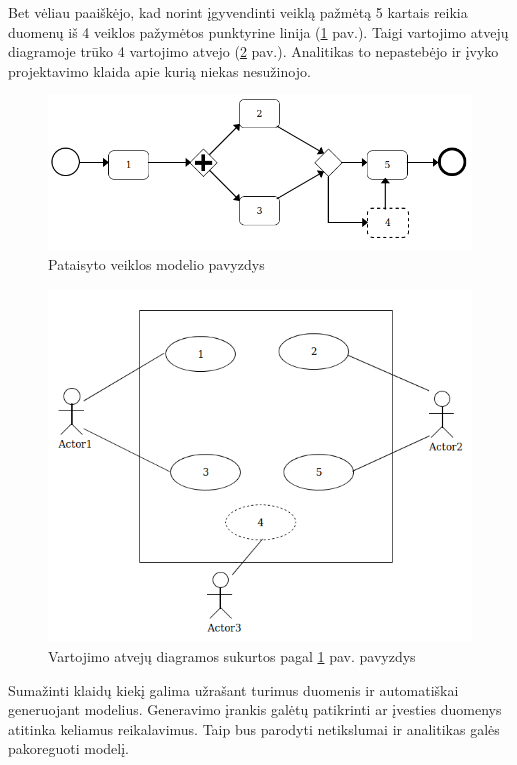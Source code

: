 \documentclass{VUMIFInfBakalaurinis}
\begin{document}
Bet vėliau paaiškėjo, kad norint įgyvendinti veiklą pažmėtą 5 kartais reikia duomenų iš 4 veiklos pažymėtos punktyrine linija (\ref{img:corrected_model} pav.). Taigi vartojimo atvejų diagramoje trūko 4 vartojimo atvejo (\ref{img:corrected_model_use_cases} pav.). Analitikas to nepastebėjo ir įvyko projektavimo klaida apie kurią niekas nesužinojo.

\begin{figure}[H]
	\centering
	\includegraphics[width=\textwidth]{img/bad_modeling/corrected_model}
	\caption{Pataisyto veiklos modelio pavyzdys}
	\label{img:corrected_model}
\end{figure}
\begin{figure}[H]
	\centering
	\includegraphics[width=15cm]{img/bad_modeling/corrected_model_use_cases}
	\caption{Vartojimo atvejų diagramos sukurtos pagal \ref{img:corrected_model} pav. pavyzdys}
	\label{img:corrected_model_use_cases}
\end{figure}

Sumažinti klaidų kiekį galima užrašant turimus duomenis ir automatiškai generuojant modelius. Generavimo įrankis galėtų patikrinti ar įvesties duomenys atitinka keliamus reikalavimus. Taip bus parodyti netikslumai ir analitikas galės pakoreguoti modelį.
\end{document}
